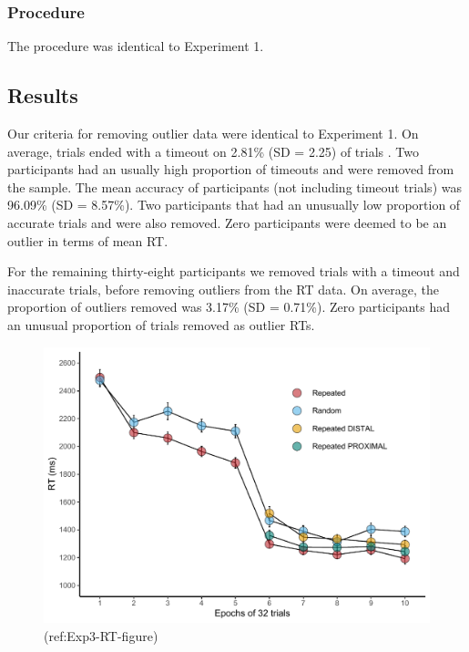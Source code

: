 \documentclass[
  man,floatsintext]{apa7}
\begin{document}
\hypertarget{procedure-2}{%
\subsubsection{Procedure}\label{procedure-2}}

The procedure was identical to Experiment 1.

\hypertarget{results-2}{%
\subsection{Results}\label{results-2}}

Our criteria for removing outlier data were identical to Experiment 1. On average, trials ended with a timeout on 2.81\% (SD = 2.25) of trials . Two participants had an usually high proportion of timeouts and were removed from the sample. The mean accuracy of participants (not including timeout trials) was 96.09\% (SD = 8.57\%). Two participants that had an unusually low proportion of accurate trials and were also removed. Zero participants were deemed to be an outlier in terms of mean RT.

For the remaining thirty-eight participants we removed trials with a timeout and inaccurate trials, before removing outliers from the RT data. On average, the proportion of outliers removed was 3.17\% (SD = 0.71\%). Zero participants had an unusual proportion of trials removed as outlier RTs.

\begin{figure}

{\centering \includegraphics{CCC_ms1_files/figure-latex/Exp3-RT-figure-1} 

}

\caption{(ref:Exp3-RT-figure)}\label{fig:Exp3-RT-figure}
\end{figure}
\end{document}

